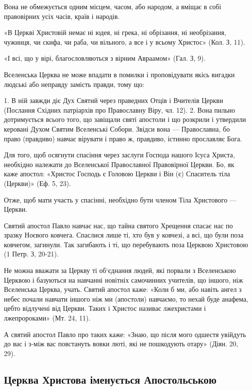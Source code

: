 \documentclass[main.tex]{subfiles}
\begin{document}
Вона не обмежується одним місцем, часом, або народом, а вміщає в собі правовірних усіх часів, країв і народів.

«В Церкві Христовій немає ні юдея, ні грека, ні обрізання, ні необрізання, чужинця, чи скифа, чи раба, чи вільного, а все і у всьому Христос» (Кол. З, 11).

«І всі, що у вірі, благословляються з вірним Авраамом» (Гал. З, 9).

Вселенська Церква не може впадати в помилки і проповідувати якісь вигадки людські або неправду замість правди, тому що:

1. В ній завжди діє Дух Святий через праведних Отців і Вчителів Церкви (Послання Східних патріархів про Православну Віру, чл. 12).
2. Вона пильно дотримується всього того, що завіщали святі апостоли і що розкрили і утвердили керовані Духом Святим Вселенські Собори. Звідси вона — Православна, бо право (правдиво) навчає вірувати і право ж, правдиво, істинно прославляє Бога.
 
Для того, щоб осягнути спасіння через заслуги Господа нашого Ісуса Христа, необхідно належати до Вселенської Православної Правовірної Церкви. Бо, як каже апостол: «Христос Господь є Головою Церкви і Він (є) Спаситель тіла (Церкви)» (Еф. 5, 23).

Отже, щоб мати участь у спасінні, необхідно бути членом Тіла Христового — Церкви.

Святий апостол Павло навчає нас, що тайна святого Хрещення спасає нас по зразку Ноєвого ковчега. Спаслися лише ті, хто був у ковчезі, а всі, що були поза ковчегом, загинули. Так загибають і ті, що перебувають поза Церквою Христовою (1 Петр. З, 20-21).

Не можна вважати за Церкву ті об`єднання людей, які порвали з Вселенською Церквою і базуються на навчанні новітніх самочинних учителів, що іншого, ніж Вселенська Церква, учать. Святий апостол каже: «Коли б ми, або навіть ангел з небес почали навчати іншого ніж ми (апостоли) навчаємо, то нехай буде анафема, цебто відлучені від Церкви. Таких і Христос називає лжехристами і лжепророками» (Мт. 24, 11).

А святий апостол Павло про таких каже: «Знаю, що після мого одшестя увійдуть до вас і з-між вас повстануть вовки люті, які не пошкодують отару» (Діян. 20, 29).

\subsection{Церква Христова іменується Апостольською}
\end{document}
